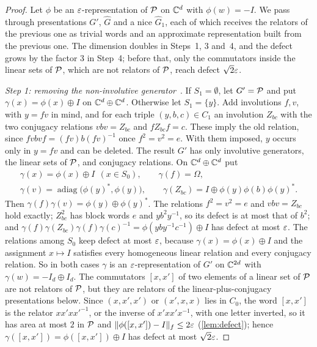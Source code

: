 \begin{proof}
Let $\phi$ be an $\varepsilon$-representation of $\mathcal P$ on $\mathbb C^d$ with $\phi(w)=-I$. We pass through presentations $G'$, $\widehat G$ and a nice
$\widehat G_1$, each of which receives the relators of the previous one as trivial words and an approximate representation built from the
previous one. The dimension doubles in Steps~1, 3 and~4, and the defect grows by the factor $3$ in Step~4; before that, only the
commutators inside the linear sets of $\mathcal P$, which are not relators of $\mathcal P$, reach defect $\sqrt2\varepsilon$.

\emph{Step 1: removing the non-involutive generator}~\cite[Prop.~4.8]{Slo19}. If $S_1=\emptyset$, let $G'=\mathcal P$ and put
$\gamma(x)=\phi(x)\oplus I$ on $\mathbb C^d\oplus\mathbb C^d$. Otherwise let $S_1=\{y\}$. Add involutions $f,v$, with $y=fv$ in mind, and for each triple
$(y,b,c)\in C_1$ an involution $Z_{bc}$ with the two conjugacy relations $vbv=Z_{bc}$ and $fZ_{bc}f=c$. These imply the old relation, since
$fvbvf=(fv)b(fv)^{-1}$ once $f^2=v^2=e$. With them imposed, $y$ occurs only in $y=fv$ and can be deleted. The result $G'$ has only involutive
generators, the linear sets of $\mathcal P$, and conjugacy relations. On $\mathbb C^d\oplus\mathbb C^d$ put
\begin{gather*}
\gamma(x)=\phi(x)\oplus I\ \ (x\in S_0),\qquad\gamma(f)=\Omega,\\
\gamma(v)=\operatorname{adiag}\bigl(\phi(y)^*,\phi(y)\bigr),\qquad\gamma(Z_{bc})=I\oplus\phi(y)\phi(b)\phi(y)^* .
\end{gather*}
Then $\gamma(f)\gamma(v)=\phi(y)\oplus\phi(y)^*$. The relations $f^2=v^2=e$ and $vbv=Z_{bc}$ hold exactly; $Z_{bc}^2$ has block words $e$
and $yb^2y^{-1}$, so its defect is at most that of $b^2$; and $\gamma(f)\gamma(Z_{bc})\gamma(f)\gamma(c)^{-1}=\phi(yby^{-1}c^{-1})\oplus I$
has defect at most $\varepsilon$. The relations among $S_0$ keep defect at most $\varepsilon$, because $\gamma(x)=\phi(x)\oplus I$ and the assignment
$x\mapsto I$ satisfies every homogeneous linear relation and every conjugacy relation. So in both cases $\gamma$ is an $\varepsilon$-representation
of $G'$ on $\mathbb C^{2d}$ with $\gamma(w)=-I_d\oplus I_d$. The commutators $[x,x']$ of two elements of a linear set of $\mathcal P$ are not relators of
$\mathcal P$, but they are relators of the linear-plus-conjugacy presentations below. Since $(x,x',x')$ or $(x',x,x)$ lies in $C_0$, the word
$[x,x']$ is the relator $xx'xx'^{-1}$, or the inverse of $x'xx'x^{-1}$, with one letter inverted, so it has area at most $2$ in $\mathcal P$ and
$\lVert \phi([x,x'])-I\rVert_f\le2\varepsilon$ (\cref{lem:defect}); hence $\gamma([x,x'])=\phi([x,x'])\oplus I$ has defect at most $\sqrt2\varepsilon$.


\end{proof}
